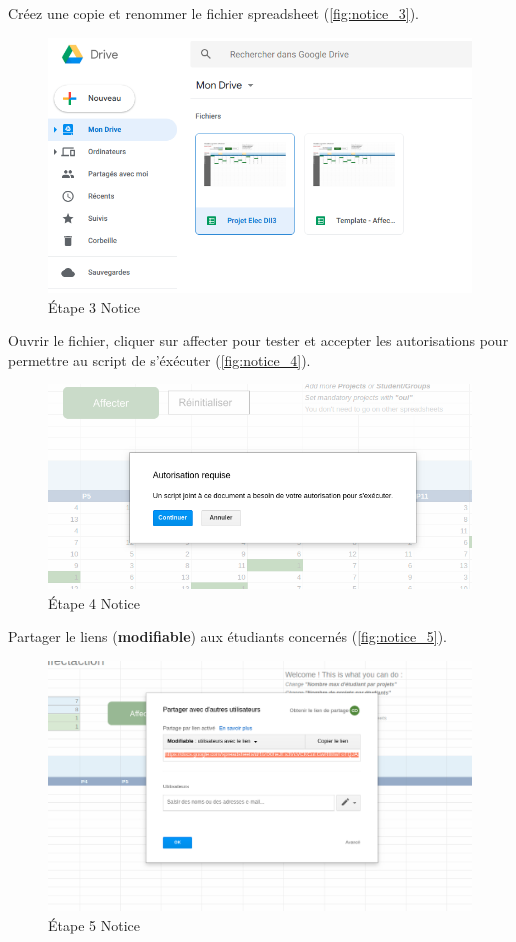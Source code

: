 \documentclass[final,poster]{polytech/polytech}
\begin{document}
Créez une copie et renommer le fichier spreadsheet (\autoref{fig:notice_3}).
\begin{figure}[htbp]
\includegraphics[width=13cm]{images/notice/notice_3}
\caption{\label{fig:notice_3}\'Etape 3 Notice}
\end{figure}

Ouvrir le fichier, cliquer sur affecter pour tester et accepter les autorisations pour permettre au script de s'éxécuter (\autoref{fig:notice_4}).
\begin{figure}[htbp]
\includegraphics[width=13cm]{images/notice/notice_4}
\caption{\label{fig:notice_4}\'Etape 4 Notice}
\end{figure}

Partager le liens (\textbf{modifiable}) aux étudiants concernés (\autoref{fig:notice_5}).
\begin{figure}[htbp]
\includegraphics[width=13cm]{images/notice/notice_5}
\caption{\label{fig:notice_5}\'Etape 5 Notice}
\end{figure}
\end{document}
